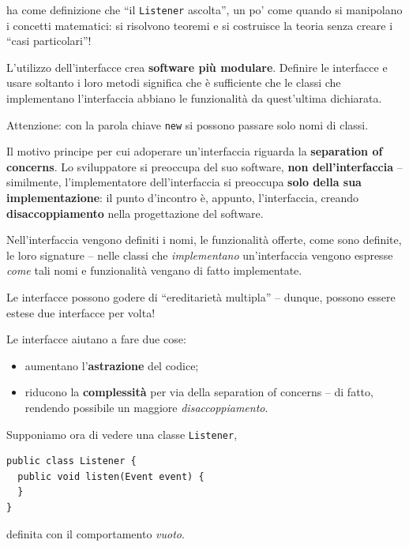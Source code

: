 \documentclass[\fontsizeclass,twocolumn]{\classname}
\theoremstyle{definition}
\theoremstyle{definition}
\begin{document}
ha come definizione che ``il \texttt{Listener} ascolta'', un po' come quando si
manipolano i concetti matematici: si risolvono teoremi e si costruisce la
teoria senza creare i ``casi particolari''!

L'utilizzo dell'interfacce crea \textbf{software più modulare}. Definire le
interfacce e usare soltanto i loro metodi significa che è sufficiente che le
classi che implementano l'interfaccia abbiano le funzionalità da quest'ultima
dichiarata.

Attenzione: con la parola chiave \texttt{new} si possono passare solo nomi di
classi.

Il motivo principe per cui adoperare un'interfaccia riguarda la
\textbf{separation of concerns}. Lo sviluppatore si preoccupa del suo software,
\textbf{non dell'interfaccia} -- similmente, l'implementatore dell'interfaccia
si preoccupa \textbf{solo della sua implementazione}: il punto d'incontro è,
appunto, l'interfaccia, creando \textbf{disaccoppiamento} nella progettazione
del software.

Nell'interfaccia vengono definiti i nomi, le funzionalità offerte, come sono
definite, le loro signature -- nelle classi che \emph{implementano}
un'interfaccia vengono espresse \emph{come} tali nomi e funzionalità vengano di
fatto implementate.

Le interfacce possono godere di ``ereditarietà multipla'' -- dunque, possono
essere estese due interfacce per volta!

Le interfacce aiutano a fare due cose:
\begin{itemize}
    \item aumentano l'\textbf{astrazione} del codice;
    \item riducono la \textbf{complessità} per via della separation of concerns
        -- di fatto, rendendo possibile un maggiore \emph{disaccoppiamento}.
\end{itemize}

Supponiamo ora di vedere una classe \texttt{Listener},

\begin{lstlisting}
public class Listener {
  public void listen(Event event) {
  }
}
\end{lstlisting}

definita con il comportamento \emph{vuoto}.
\end{document}
